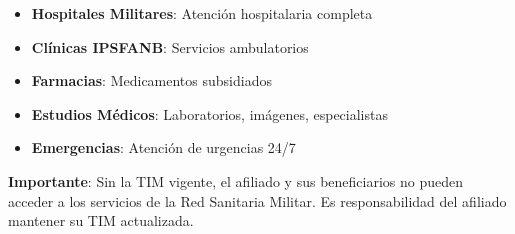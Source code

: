 \begin{itemize}[leftmargin=*]
    \item \textbf{Hospitales Militares}: Atención hospitalaria completa
    \item \textbf{ Clínicas IPSFANB}: Servicios ambulatorios
    \item \textbf{ Farmacias}: Medicamentos subsidiados
    \item \textbf{ Estudios Médicos}: Laboratorios, imágenes, especialistas
    \item \textbf{Emergencias}: Atención de urgencias 24/7
\end{itemize}

\begin{tcolorbox}[
    colback=sandraSoft,
    colframe=sandraAccent,
    width=0.9\textwidth,
    halign=center
]
\small
\textbf{Importante}: Sin la TIM vigente, el afiliado y sus beneficiarios no pueden acceder a los servicios de la Red Sanitaria Militar. Es responsabilidad del afiliado mantener su TIM actualizada.
\end{tcolorbox}

\newpage
